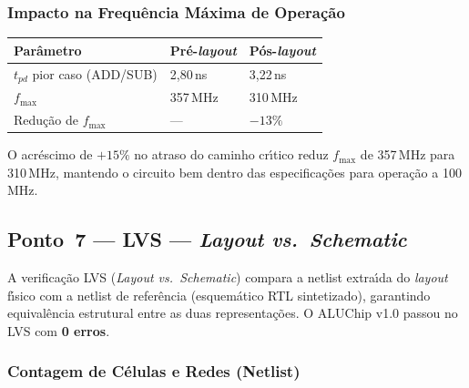 \documentclass[12pt,a4paper]{article}
\begin{document}
\subsubsection{Impacto na Frequ\^{e}ncia M\'{a}xima de Opera\c{c}\~{a}o}

\begin{specbox}
\begin{tabular}{lll}
\textbf{Par\^{a}metro} & \textbf{Pr\'{e}-\textit{layout}} & \textbf{P\'{o}s-\textit{layout}} \\
\hline
$t_{pd}$ pior caso (ADD/SUB) & 2,80\,ns & 3,22\,ns \\
$f_{\max}$                   & 357\,MHz & 310\,MHz \\
Redu\c{c}\~{a}o de $f_{\max}$  & ---      & $-13\%$ \\
\end{tabular}
\end{specbox}

O acr\'{e}scimo de $+15\%$ no atraso do caminho cr\'{\i}tico reduz $f_{\max}$ de 357\,MHz para 310\,MHz, mantendo o circuito bem dentro das especifica\c{c}\~{o}es para opera\c{c}\~{a}o a 100\,MHz.

\subsection{Ponto~7 --- LVS --- \textit{Layout vs.\ Schematic}}
\label{sec:lvs}

A verifica\c{c}\~{a}o LVS (\textit{Layout vs.\ Schematic}) compara a netlist extra\'{\i}da do \textit{layout} f\'{\i}sico com a netlist de refer\^{e}ncia (esquem\'{a}tico RTL sintetizado), garantindo equival\^{e}ncia estrutural entre as duas representa\c{c}\~{o}es. O ALUChip v1.0 passou no LVS com \textbf{0 erros}.

\subsubsection{Contagem de C\'{e}lulas e Redes (Netlist)}
\end{document}

